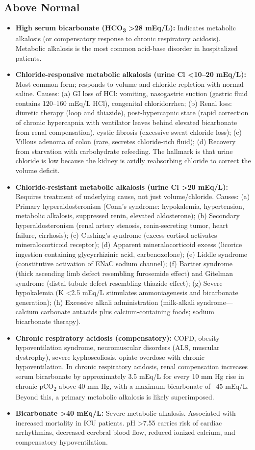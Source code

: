 \subsection*{Above Normal}
\begin{itemize}
  \item \textbf{High serum bicarbonate (HCO\textsubscript{3} >28 mEq/L):} Indicates metabolic alkalosis (or compensatory response to chronic respiratory acidosis). Metabolic alkalosis is the most common acid-base disorder in hospitalized patients.
  \item \textbf{Chloride-responsive metabolic alkalosis (urine Cl <10--20 mEq/L):} Most common form; responds to volume and chloride repletion with normal saline. Causes: (a) GI loss of HCl: vomiting, nasogastric suction (gastric fluid contains 120--160 mEq/L HCl), congenital chloridorrhea; (b) Renal loss: diuretic therapy (loop and thiazide), post-hypercapnic state (rapid correction of chronic hypercapnia with ventilator leaves behind elevated bicarbonate from renal compensation), cystic fibrosis (excessive sweat chloride loss); (c) Villous adenoma of colon (rare, secretes chloride-rich fluid); (d) Recovery from starvation with carbohydrate refeeding. The hallmark is that urine chloride is low because the kidney is avidly reabsorbing chloride to correct the volume deficit.
  \item \textbf{Chloride-resistant metabolic alkalosis (urine Cl >20 mEq/L):} Requires treatment of underlying cause, not just volume/chloride. Causes: (a) Primary hyperaldosteronism (Conn's syndrome: hypokalemia, hypertension, metabolic alkalosis, suppressed renin, elevated aldosterone); (b) Secondary hyperaldosteronism (renal artery stenosis, renin-secreting tumor, heart failure, cirrhosis); (c) Cushing's syndrome (excess cortisol activates mineralocorticoid receptor); (d) Apparent mineralocorticoid excess (licorice ingestion containing glycyrrhizinic acid, carbenoxolone); (e) Liddle syndrome (constitutive activation of ENaC sodium channel); (f) Bartter syndrome (thick ascending limb defect resembling furosemide effect) and Gitelman syndrome (distal tubule defect resembling thiazide effect); (g) Severe hypokalemia (K <2.5 mEq/L stimulates ammoniagenesis and bicarbonate generation); (h) Excessive alkali administration (milk-alkali syndrome---calcium carbonate antacids plus calcium-containing foods; sodium bicarbonate therapy).
  \item \textbf{Chronic respiratory acidosis (compensatory):} COPD, obesity hypoventilation syndrome, neuromuscular disorders (ALS, muscular dystrophy), severe kyphoscoliosis, opiate overdose with chronic hypoventilation. In chronic respiratory acidosis, renal compensation increases serum bicarbonate by approximately 3.5 mEq/L for every 10 mm Hg rise in chronic pCO\textsubscript{2} above 40 mm Hg, with a maximum bicarbonate of ~45 mEq/L. Beyond this, a primary metabolic alkalosis is likely superimposed.
  \item \textbf{Bicarbonate >40 mEq/L:} Severe metabolic alkalosis. Associated with increased mortality in ICU patients. pH >7.55 carries risk of cardiac arrhythmias, decreased cerebral blood flow, reduced ionized calcium, and compensatory hypoventilation.
\end{itemize}

